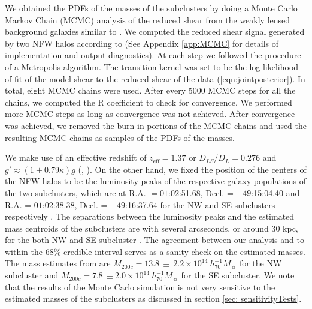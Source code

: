 We obtained the PDFs of the masses of the subclusters by doing a Monte
Carlo Markov Chain (MCMC) analysis of the reduced shear from the
weakly lensed background galaxies similar to \citet{Dawson12}. We computed the reduced shear signal
generated by two NFW halos according to \citet{Umetsu10} (See Appendix
\ref{app:MCMC} for
details of implementation and output diagnostics).
At each step we followed the procedure of a
Metropolis algorithm.  The transition kernel was set to
be the log likelihood of fit of the model shear to the reduced shear of the
data (\ref{eqn:jointposterior}).
In total, eight MCMC chains were used. After every 5000 MCMC steps for all
the chains, we computed the R coefficient \citep{Gelman92}  to
check for convergence. We performed more MCMC steps as long as convergence
was not achieved. After convergence was achieved, we removed the
burn-in portions of the MCMC chains and used the resulting MCMC chains as
samples of the PDFs of the masses. \par 
We make use of an effective redshift of $z_{\text{eff}} = 1.37$ or $D_{LS}
/ D_L = 0.276$  and $g'\approx(1 + 0.79 \kappa)g$
(, \citealt{Seitz97}).    
On the other hand, we fixed the
position of the centers of the NFW halos to be  the luminosity peaks of the
respective galaxy populations of  the two subclusters, which are at R.A. $=
01$:02:51.68, Decl. = $-49$:15:04.40 and R.A. = $01$:02:38.38, Decl. =
$-49$:16:37.64 for the NW and SE subclusters
respectively . The separations between the luminosity
peaks and the estimated mass centroids of the subclusters are with several
arcseconds, or around 30 kpc, for the both NW and SE subcluster 
. The agreement between our analysis and  to within
the 68\% credible interval serves as a sanity check on the estimated masses. 
The mass estimates from \citealt{Jee13} are $M_{200c} = 13.8~\pm~2.2\times
10^{14}~h_{70}^{-1} M_{\sun}$ for the NW subcluster and $M_{200c} = 7.8~\pm
2.0\times10^{14}~h_{70}^{-1} M_{\sun}$ for the SE subcluster. 
We note that the results of the Monte Carlo simulation is not very
sensitive to the estimated masses of the subclusters as discussed in section \ref{sec: sensitivityTests}.
